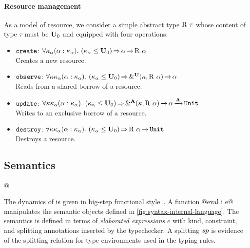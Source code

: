 
\paragraph{Resource management}

As a model of resource, we consider a simple abstract
type $\tapp{\tres}{\tau}$ whose content of type $\tau$ must be $\kun_0$ and
equipped with four operations:
\begin{itemize}
\item
$\create$:
$\forall{\kvar_\tvar}\bvar{\tvar}{\kvar_\tvar}.\
\qual{\Cleq {\kvar_\tvar} {\kun_0}}
{\tvar \tarr{} \tapp\tres\tvar}$\\
Creates a new resource.

\item
$\observe$:
$\forall{\kvar\kvar_\tvar}\bvar{\tvar}{\kvar_\tvar}.\
\qual{\Cleq {\kvar_\tvar} {\kun_0}}
{\borrowty[\IBORROW]{\kvar}{\tapp\tres\tvar} \tarr{} \tvar}$\\
Reads from a shared borrow of a resource.

\item
$\update$:
$\forall{\kvar\kvar_\tvar}\bvar{\tvar}{\kvar_\tvar}.\
\qual{\Cleq {\kvar_\tvar} {\kun_0}}
\borrowty[\MBORROW]{\kvar}{\tapp\tres\tvar} \tarr{} \tvar \tarr{\kaff} \tunit$\\
Writes to an exclusive borrow of a resource.

\item
$\destroy$:
$\forall{\kvar\kvar_\tvar}\bvar{\tvar}{\kvar_\tvar}.\
\qual{\Cleq {\kvar_\tvar} {\kun_0}}
\tapp\tres\tvar \tarr{} \tunit$\\
Destroys a resource.
\end{itemize}

\subsection{Semantics}
\label{sec:sem}


\lstMakeShortInline[keepspaces,style=rule,basicstyle=\normalsize\normalfont]@

The dynamics of \lang is given in big-step
functional
style~\cite{siek13:_type_safet_three_easy_lemmas,DBLP:conf/esop/OwensMKT16,
  DBLP:conf/popl/AminR17}.  A function
@eval \Store \Perm \VEnv i e@
manipulates the semantic objects defined in
\cref{fig:syntax-internal-language}.
%
The semantics is defined in terms of \emph{elaborated expressions} $e$
with kind, constraint, and splitting annotations inserted by the typechecker.
A splitting $\Sp$ is evidence of the splitting relation for type environments
used in the typing rules.

